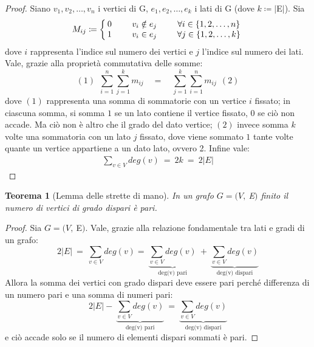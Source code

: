 \documentclass[12pt]{article}
\newcommand{\Eps}{$E\:$}
\newcommand{\MathEps}{E}
\newcommand{\grafo}{(V, \: \Eps)}
\newtheorem{theorem}{Teorema}
\begin{document}
\begin{proof}
	Siano $v_1, v_2,\ldots ,v_n$ i vertici di G, $e_1, e_2,\ldots, e_k$ i lati di G (dove $k \coloneqq | \Eps |$). Sia
	\[
	M_{ij} \coloneqq \left\{
	\setlength\arraycolsep{2pt}
	\begin{array}{ccc} 0 & \qquad v_i \notin e_j & \qquad \forall i \in \{1, 2, \ldots , n\} \\ \relax
		1       & \qquad v_i \in e_j    & \qquad \forall j \in \{1, 2, \ldots ,k \}
	\end{array}\right
	.
	\]
	dove $i$ rappresenta l'indice sul numero dei vertici e $j$ l'indice sul numero dei lati. Vale, grazie alla proprietà commutativa delle somme:
	$$ (1)\ \ \sum_{i=1}^n \sum_{j=1}^k m_{ij} \quad = \quad \sum_{j=1}^k\sum_{i=1}^n m_{ij}\ \ (2)$$
	dove $(1)$ rappresenta una somma di sommatorie con un vertice $i$ fissato; in ciascuna somma, si somma $1$ se un lato contiene il vertice fissato, $0$ se ciò non accade. Ma ciò non è altro che il grado del dato vertice; $(2)$ invece somma $k$ volte una sommatoria con un lato $j$ fissato, dove viene sommato $1$ tante volte quante un vertice appartiene a un dato lato, ovvero 2. Infine vale:
	\begin{align*}
		\sum_{v\in V} deg(v) \ = \ 2k \ =\ 2 |\MathEps |
	\end{align*}
\end{proof}

\begin{theorem}[Lemma delle strette di mano]
	In un grafo $G = \grafo$ finito il numero di vertici di grado dispari è pari.
\end{theorem}

\begin{proof}
	Sia $G = \grafo$. Vale, grazie alla relazione fondamentale tra lati e gradi di un grafo:
	\[
	2 | \MathEps | \ =\ \sum_{v\in V} deg (v)
	= \ \underbrace{\sum_{v\in V} deg (v)}_{\text{deg(v) pari}} \ + \ \underbrace{\sum_{v\in V} deg (v)}_{\text{deg(v) dispari}}
	\]
	Allora la somma dei vertici con grado dispari deve essere pari perché differenza di un numero pari e una somma di numeri pari:
	\[
	2 | \MathEps | - \ \underbrace{\sum_{v\in V} deg (v)}_{\text{deg(v) pari}} \ = \ \underbrace{\sum_{v\in V} deg (v)}_{\text{deg(v) dispari}}
	\]
	e ciò accade solo se il numero di elementi dispari sommati è pari.
\end{proof}
\end{document}
